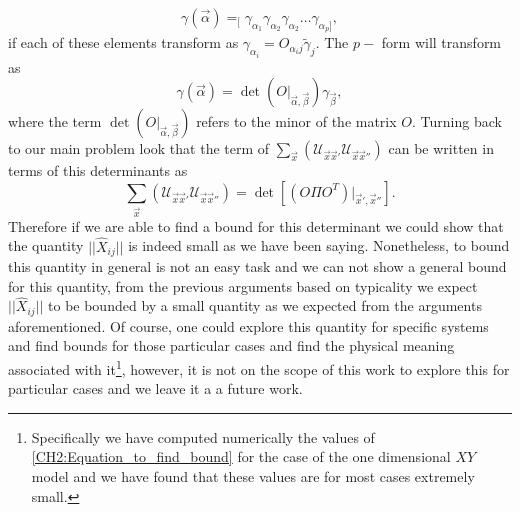 \begin{equation}
\gamma(\vec{\alpha}) =_{[}\gamma_{\alpha_1}\gamma_{\alpha_2}\gamma_{\alpha_2}\ldots\gamma_{\alpha_p]},
\end{equation}
if each of these elements transform as $\gamma_{\alpha_i} = O_{\alpha_i j} \tilde{\gamma}_{j}$. The $p-$ form will transform as
\begin{equation}
\gamma(\vec{\alpha}) = \operatorname{det}\left(O\big|_{\vec{\alpha},\vec{\beta}}\right)\gamma_{\vec{\beta}},
\label{CH2:transformations_of_operators}
\end{equation}
where the term $\operatorname{det}\left(O\big|_{\vec{\alpha},\vec{\beta}}\right)$ refers to the minor of the matrix $O$. Turning back to our main problem look that the term of $\sum_{\vec{x}}\left(	\mathcal{U}_{\vec{x}\vec{x}'} \mathcal{U}_{\vec{x}\vec{x}''}\right)$ can be written in terms of this determinants as
\begin{equation}
\sum_{\vec{x}}\left(	\mathcal{U}_{\vec{x}\vec{x}'} \mathcal{U}_{\vec{x}\vec{x}''}\right) = \operatorname{det}\left[\left(O\Pi O^T\right)\big|_{\vec{x}',\vec{x}''}\right].
\label{CH2:Equation_to_find_bound}
\end{equation}
\indent Therefore if we are able to find a bound for this determinant we could show that the quantity $||\hat{X}_{ij}||$ is indeed small as we have been saying. Nonetheless, to bound this quantity in general is not an easy task and we can not show a general bound for this quantity, from the previous arguments based on typicality we expect $||\hat{X}_{ij}||$ to be bounded by a small quantity as we expected from the arguments aforementioned. Of course, one could explore this quantity for specific systems and find bounds for those particular cases and find the physical meaning associated with it\footnote{Specifically we have computed numerically the values of  \eqref{CH2:Equation_to_find_bound} for the case of the one dimensional $XY$ model and we have found that these values are for most cases extremely small.}, however, it is not on the scope of this work to explore this for particular cases and we leave it a a future work.






